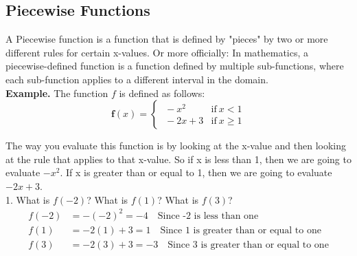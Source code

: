 \subsection{Piecewise Functions}
A Piecewise function is a function that is defined by "pieces" by two or more different rules for certain x-values. Or more officially: In mathematics, a piecewise-defined function is a function defined by multiple sub-functions, where each sub-function applies to a different interval in the domain. \\
\textbf{Example.} The function $f$ is defined as follows: 
\begin{equation}
	\mathbf f(x) = \begin{cases}
	  \;-x^2 \quad &\text{if} \ x < 1\\
	  \;-2x+3 &\text{if} \ x \geq 1
	\end{cases}
\end{equation}

The way you evaluate this function is by looking at the x-value and then looking at the rule that applies to that x-value. So if x is less than 1, then we are going to evaluate $-x^2$. If x is greater than or equal to 1, then we are going to evaluate $-2x+3$. \\

1. What is $f(-2)$? What is $f(1)$? What is $f(3)$? \\
\begin{align*}
	f(-2) &= -(-2)^2 = -4 \quad \text{Since -2 is less than one} \\
	f(1) &= -2(1)+3 = 1 \quad \text{Since 1 is greater than or equal to one} \\
	f(3) &= -2(3)+3 = -3 \quad \text{Since 3 is greater than or equal to one} \\
\end{align*}